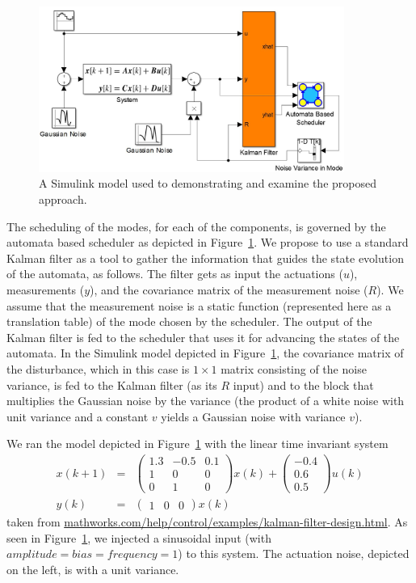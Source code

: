 \documentclass[ twoside, 12pt ]{article}
\begin{document}
\begin{figure}%
    \centerline{\includegraphics[width=100mm]{SimulinkModel.jpg}}
    \caption{A Simulink model used to demonstrating and  examine the proposed approach.}
    \label{fig:simulink}
\end{figure}

The scheduling of the modes, for each of the components, is governed by the automata based scheduler as depicted in Figure~\ref{fig:simulink}. We propose to use a standard Kalman filter as a tool to gather the information that guides the state evolution of the automata, as follows. The filter gets as input the actuations ($u$),  measurements ($y$), and the covariance matrix of the measurement noise ($R$). We assume that the measurement noise is a static function (represented here as a translation table) of the mode chosen by the scheduler. The output of the Kalman filter is fed to the scheduler that uses it for advancing the states of the automata. 
In the Simulink model depicted in Figure~\ref{fig:simulink}, the covariance matrix of the disturbance, which in this case is $1 \times 1$ matrix consisting of the noise variance, is fed to the Kalman filter (as its $R$ input) and to the block that multiplies the Gaussian noise by the variance (the product of a white noise with unit variance and a constant $v$ yields a Gaussian noise with variance $v$).

We ran the model depicted in Figure~\ref{fig:simulink} with the linear time invariant system
\begin{eqnarray*}
    x(k+1) &=& \begin{pmatrix}        1.3  & -0.5  & 0.1 \\
        1    & 0     & 0 \\
        0    & 1     & 0
    \end{pmatrix}x(k)+ 
    \begin{pmatrix}
        -0.4 \\
        0.6\\
        0.5\end{pmatrix} u(k) \\
    y(k)&=& \begin{pmatrix}1 & 0 &0\end{pmatrix}x(k)
\end{eqnarray*}
taken from \url{mathworks.com/help/control/examples/kalman-filter-design.html}. As seen in Figure~\ref{fig:simulink}, we injected a sinusoidal input (with $amplitude=bias=frequency=1$) to this system. 
The actuation noise, depicted on the left, is with a unit variance. 
\end{document}
